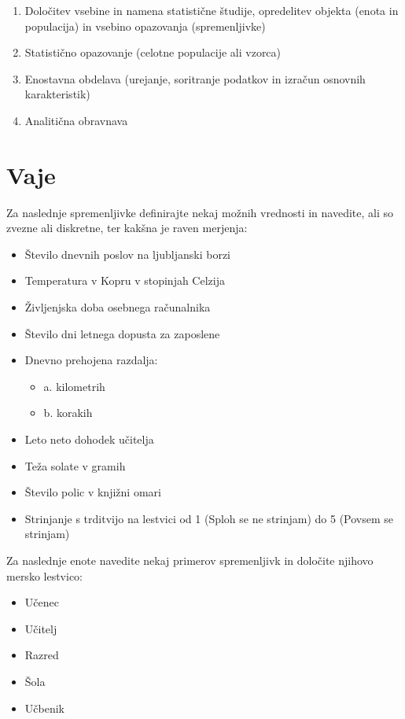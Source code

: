 \begin{enumerate}[i]
\item Določitev vsebine in namena statistične študije, opredelitev objekta (enota in populacija) in vsebino opazovanja (spremenljivke)
\item Statistično opazovanje (celotne populacije ali vzorca)
\item Enostavna obdelava (urejanje, soritranje podatkov in izračun osnovnih karakteristik)
\item Analitična obravnava
\end{enumerate}

\section*{Vaje}

\begin{Vaje}{1}
        Za naslednje spremenljivke definirajte nekaj možnih vrednosti in navedite, ali so zvezne ali diskretne, ter kakšna je raven merjenja:
        \begin{itemize}
            \item Število dnevnih poslov na ljubljanski borzi
            \item Temperatura v Kopru v stopinjah Celzija
            \item Življenjska doba osebnega računalnika
            \item Število dni letnega dopusta za zaposlene
            \item Dnevno prehojena razdalja:
            \begin{itemize}
                \item a. kilometrih
                \item b. korakih
            \end{itemize}
            \item Leto neto dohodek učitelja
            \item Teža solate v gramih
            \item Število polic v knjižni omari
            \item Strinjanje s trditvijo na lestvici od 1 (Sploh se ne strinjam) do 5 (Povsem se strinjam)
        \end{itemize}
\end{Vaje}

\begin{Vaje}{2}
        Za naslednje enote navedite nekaj primerov spremenljivk in določite njihovo mersko lestvico:
        \begin{itemize}
            \item Učenec
            \item Učitelj
            \item Razred
            \item Šola
            \item Učbenik
        \end{itemize}
\end{Vaje}


